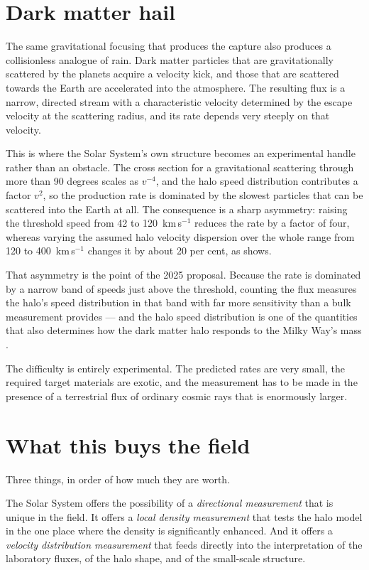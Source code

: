 \section{Dark matter hail}The same gravitational focusing that produces the capture
also produces a collisionless analogue of rain. Dark matter particles that
are gravitationally scattered by the planets acquire a velocity kick, and
those that are scattered towards the Earth are accelerated into the
atmosphere. The resulting flux is a narrow, directed stream with a
characteristic velocity determined by the escape velocity at the scattering
radius, and its rate depends very steeply on that velocity.

This is where the Solar System's own structure becomes an experimental
handle rather than an obstacle. The cross section for a gravitational
scattering through more than 90 degrees scales as $v^{-4}$, and the halo
speed distribution contributes a factor $v^2$, so the production rate is
dominated by the slowest particles that can be scattered into the Earth at
all. The consequence is a sharp asymmetry: raising the threshold speed from
42 to 120~km\,s$^{-1}$ reduces the rate by a factor of four, whereas
varying the assumed halo velocity dispersion over the whole range from 120 to
400~km\,s$^{-1}$ changes it by about 20 per cent, as
 shows.

That asymmetry is the point of the 2025 proposal. Because the rate is
dominated by a narrow band of speeds just above the threshold, counting the
flux measures the halo's speed distribution in that band with far more
sensitivity than a bulk measurement provides --- and the halo speed
distribution is one of the quantities that also determines how the dark
matter halo responds to the Milky Way's mass .

The difficulty is entirely experimental. The predicted rates are very small,
the required target materials are exotic, and the measurement has to be made
in the presence of a terrestrial flux of ordinary cosmic rays that is
enormously larger.

\section{What this buys the field}Three things, in order of how much they are worth.

The Solar System offers the possibility of a \emph{directional measurement}
that is unique in the field. It offers a \emph{local density measurement}
that tests the halo model in the one place where the density is
significantly enhanced. And it offers a \emph{velocity distribution
measurement} that feeds directly into the interpretation of the laboratory
fluxes, of the halo shape, and of the small-scale structure.

